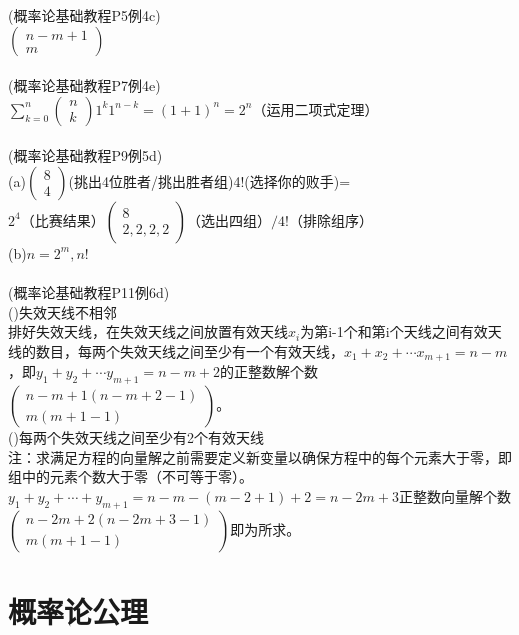 \documentclass{book}%
\begin{document}
	(概率论基础教程P5例4c)\\
	$\begin{pmatrix}n-m+1\\m\end{pmatrix}$\\
	~\\
	
	(概率论基础教程P7例4e)\\
	$\displaystyle{\sum_{k=0}^{n}\begin{pmatrix}n\\k\end{pmatrix}1^{k}1^{n-k}=(1+1)^{n}=2^n}$（运用二项式定理）\\
	~\\
	
	(概率论基础教程P9例5d)\\
	(a)$\begin{pmatrix}8\\4\end{pmatrix}$(挑出4位胜者/挑出胜者组)4!(选择你的败手)=$2^{4}\text{（比赛结果）}\begin{pmatrix}8\\2,2,2,2\end{pmatrix}\text{（选出四组）}/4!\text{（排除组序）}$\\
	(b)$n=2^{m},n!$\\
	~\\
	
	(概率论基础教程P11例6d)\\
	()失效天线不相邻\\
	排好失效天线，在失效天线之间放置有效天线$x_{i}$为第i-1个和第i个天线之间有效天线的数目，每两个失效天线之间至少有一个有效天线，$x_{1}+x_{2}+\cdots x_{m+1}=n-m$，即$y_{1}+y_{2}+\cdots y_{m+1}=n-m+2$的正整数解个数$\begin{pmatrix}n-m+1(n-m+2-1)\\m(m+1-1)\end{pmatrix}$。\\
	()每两个失效天线之间至少有2个有效天线\\
	注：求满足方程的向量解之前需要定义新变量以确保方程中的每个元素大于零，即组中的元素个数大于零（不可等于零）。\\
	$y_{1}+y_{2}+\cdots +y_{m+1}=n-m-(m-2+1)+2=n-2m+3$正整数向量解个数$\begin{pmatrix}n-2m+2(n-2m+3-1)\\m(m+1-1)\end{pmatrix}$即为所求。	
	
	\section{概率论公理}
	
\end{document}
